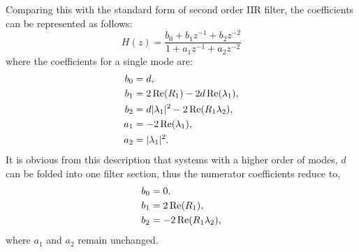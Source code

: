 Comparing this with the standard form of second order IIR filter, the coefficients can be represented as follows:
\begin{equation}
\label{eq:iir-filter}
H(z) = \frac{b_0 + b_1 z^{-1} + b_2 z^{-2}}{1 + a_1 z^{-1} + a_2 z^{-2}}
\end{equation}
where the coefficients for a single mode are:
\begin{subequations}
\label{eq:biquad-coeffs}
\begin{align}
    b_0 &= d, \\
    b_1 &= 2\operatorname{Re}(R_1) - 2d\operatorname{Re}(\lambda_1), \\
    b_2 &= d|\lambda_1|^2 - 2\operatorname{Re}(R_1\lambda_2), \\
    a_1 &= -2\operatorname{Re}(\lambda_1), \\
    a_2 &= |\lambda_1|^2.
\end{align}
\end{subequations}
It is obvious from this description that systems with a higher order of modes, $d$ can be folded into one filter section, thus the numerator coefficients reduce to,
\begin{subequations}
\label{eq:biquad-coeffs-2}
\begin{align}
    b_0 &= 0, \\
    b_1 &= 2\operatorname{Re}(R_1), \\
    b_2 &= -2\operatorname{Re}(R_1\lambda_2), \\
\end{align}
\end{subequations}
where $a_1$ and $a_2$ remain unchanged.

